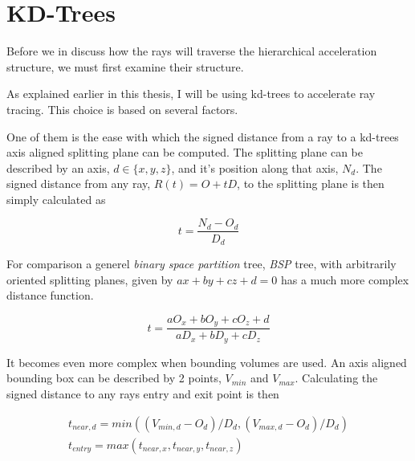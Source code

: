\chapter{KD-Trees}\label{chp:kdTrees}




Before we in  discuss how the rays will
traverse the hierarchical acceleration structure, we must first
examine their structure.


As explained earlier in this thesis, I will be using kd-trees to
accelerate ray tracing. This choice is based on several factors. 


One of them is the ease with which the signed distance from a ray to a
kd-trees axis aligned splitting plane can be computed. The splitting
plane can be described by an axis, $d \in \{x, y, z\}$, and it's
position along that axis, $N_d$. The signed distance from any ray,
$R(t) = O + tD$, to the splitting plane is then simply calculated as

\begin{displaymath}
  t = \frac{N_d - O_d}{D_d}
\end{displaymath}

For comparison a generel \textit{binary space partition} tree,
\textit{BSP} tree, with arbitrarily oriented splitting planes, given
by $ax + by + cz + d = 0$ has a much more complex distance function.

\begin{displaymath}
  t = \frac{a O_x + b O_y + c O_z + d}{a D_x + b D_y + c D_z}
\end{displaymath}

It becomes even more complex when bounding volumes are used. An axis
aligned bounding box can be described by 2 points, $V_{min}$ and
$V_{max}$. Calculating the signed distance to any rays entry and exit
point is then

\begin{displaymath}
  \begin{array}{l}
    t_{near,d} = min((V_{min,d} - O_d) / D_d, (V_{max,d} - O_d) / D_d)\\
    t_{entry} = max(t_{near,x}, t_{near,y}, t_{near,z})
  \end{array}
\end{displaymath}

